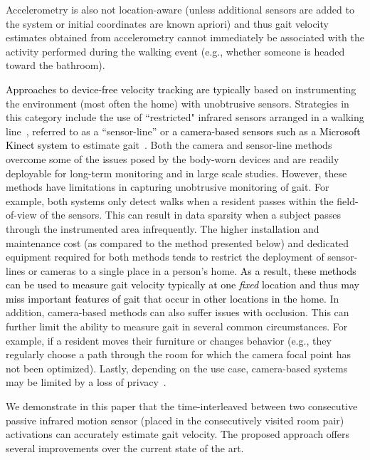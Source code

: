 \documentclass[journal]{IEEEtran}
\newcommand{\RR}[1]{\textcolor{black}{#1}}
\newcommand{\ca}[1]{\textcolor{black}{#1}}
\begin{document}
Accelerometry is also not location-aware (unless additional sensors are added to the system or initial coordinates are known apriori) and thus gait velocity estimates obtained from accelerometry cannot immediately be associated with the activity performed during the walking event (e.g., whether someone is headed toward the bathroom). 

\ca{Approaches to device-free velocity tracking are typically} based on instrumenting the environment (most often the home) with unobtrusive sensors.  Strategies in this category include the use of ``restricted" infrared sensors arranged in a walking line~\cite{hagler2010unobtrusive,kaye2012one}, referred to as a ``sensor-line'' or \ca{a camera-based sensors such as a Microsoft Kinect system} to estimate gait~\cite{Clark2013,Stone2013,sivapalan2011compressive}.  Both the camera and sensor-line methods overcome some of the issues posed by the body-worn devices and are readily deployable for long-term monitoring and in large scale studies.  However, these methods have limitations in capturing unobtrusive monitoring of gait.  For example, both systems only detect walks when a resident passes within the field-of-view of the sensors.  This can result in data sparsity when a subject passes through the instrumented area infrequently. The higher installation and maintenance cost (as compared to the method presented below) and dedicated equipment required for both methods tends to restrict the deployment of sensor-lines or cameras to a single place in a person's home. \RR{As a result, these methods can be used to measure gait velocity typically at one \emph{fixed} location and thus may miss important features of gait that occur in other locations in the home.}
In addition, camera-based methods can also suffer issues with occlusion.  This can further limit the ability to measure gait in several common circumstances.  For example, if a resident moves their furniture or changes behavior (e.g., they regularly choose a path through the room for which the camera focal point has not been optimized). 
Lastly, depending on the use case, camera-based systems may be limited by a loss of privacy~\cite{demiris2009older,boise2013willingness}.


We demonstrate in this paper that the time-interleaved between two consecutive passive infrared motion sensor (placed in the consecutively visited room pair) activations can accurately estimate gait velocity.  The proposed approach offers several improvements over the current state of the art. 
\end{document}
